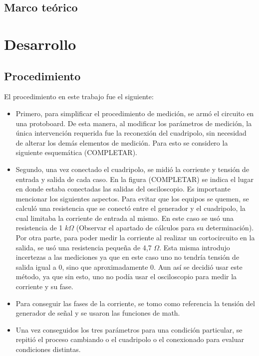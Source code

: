 \documentclass{article}
\begin{document}
\subsection{Marco teórico}

   


\section{Desarrollo}
    \subsection{Procedimiento}
    
    El procedimiento en este trabajo fue el siguiente:
    
    \begin{itemize}
    \item Primero, para simplificar el procedimiento de medición, se armó el circuito en una protoboard. De esta manera, al modificar los parámetros de medición, la única intervención requerida fue la reconexión del cuadripolo, sin necesidad de alterar los demás elementos de medición. Para esto se considero la siguiente esquemática (COMPLETAR).
    \item Segundo, una vez conectado el cuadripolo, se midió la corriente y tensión de entrada y salida de cada caso. En la figura (COMPLETAR) se indica el lugar en donde estaba conectadas las salidas del osciloscopio. Es importante mencionar los siguientes aspectos. Para evitar que los equipos se quemen, se calculó una resistencia que se conectó entre el generador y el cuadripolo, la cual limitaba la corriente de entrada al mismo. En este caso se usó una resistencia de 1 $ k\Omega$ (Observar el apartado de cálculos para su determinación). Por otra parte, para poder medir la corriente al realizar un cortocircuito en la salida, se usó una resistencia pequeña de 4,7 $\Omega$. Esta misma introdujo incertezas a las mediciones ya que en este caso uno no tendría tensión de salida igual a 0, sino que aproximadamente 0. Aun así se decidió usar este método, ya que sin esto, uno no podía usar el osciloscopio para medir la corriente y su fase.
    \item Para conseguir las fases de la corriente, se tomo como referencia la tensión del generador de señal y se usaron las funciones de math. 
    \item Una vez conseguidos los tres parámetros para una condición particular, se repitió el proceso cambiando o el cuadripolo o el conexionado para evaluar condiciones distintas.
\end{itemize}
\end{document}

